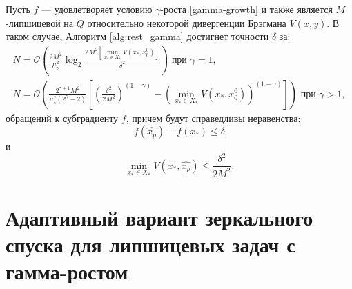     \begin{remark}
        Пусть $f$ --- удовлетворяет условию $\gamma$-роста \eqref{gamma-growth} и также является $M$-липшицевой на $Q$ относительно некоторой дивергенции Брэгмана $V(x, y)$. В таком случае, Алгоритм \ref{alg:rest_gamma} достигнет точности $\delta$ за:
        \begin{equation}
            \begin{aligned}
               N = \mathcal{O}\left(\frac{2 M^2}{\mu_{\gamma}^2} \log_2{\frac{2 M^2 \left[\min\limits_{x_* \in X_*}{V(x_*, x_0^0)}\right]}{\delta^2}}\right) \text{ при } \gamma = 1, \\
               N = \mathcal{O}\left(\frac{2^{\gamma + 1} M^2}{\mu_{\gamma}^2 (2^{\gamma} - 2)} \left[\left(\frac{\delta^2}{2 M^2}\right)^{(1 - \gamma)} - \left(\min\limits_{x_* \in X_*}{V(x_*, x_0^0)}\right)^{(1 - \gamma)}\right]\right) \text{ при } \gamma > 1,
            \end{aligned}
        \end{equation}
        обращений к субградиенту $f$, причем будут справедливы неравенства:
        \begin{equation}
           f(\widehat{x_p}) - f(x_*)  \leq \delta 
        \end{equation}
        и
        \begin{equation}
           \min\limits_{x_* \in X_*}{V(x_*, \widehat{x_p})} \leq \frac{\delta^2}{2 M^2}.
        \end{equation}
    \end{remark}

\section{Адаптивный вариант зеркального спуска для липшицевых задач с гамма-ростом}\label{sec:ch3/sect4}

